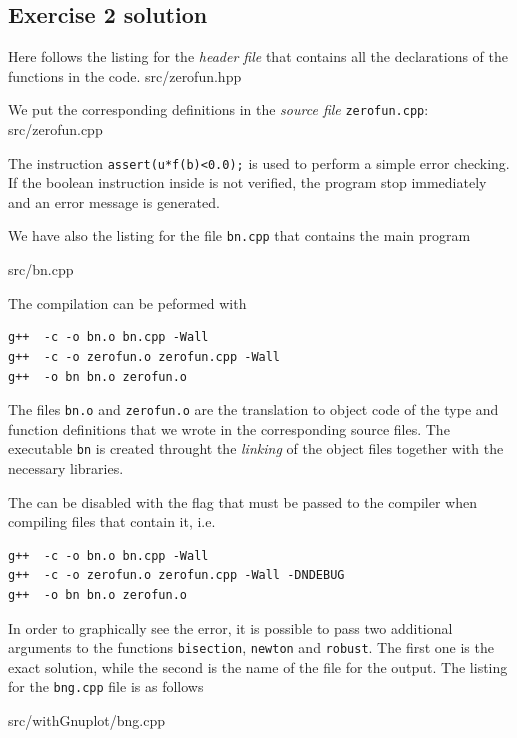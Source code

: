 \subsection*{Exercise 2 solution}

Here follows the listing for the \emph{header file} that contains all the
declarations of the functions in the code.
\lstset{basicstyle=\scriptsize\sf}
     {src/zerofun.hpp}
\lstset{basicstyle=\sf}

We put the corresponding definitions in the \emph{source file}
\texttt{zerofun.cpp}:
\lstset{basicstyle=\scriptsize\sf}
     {src/zerofun.cpp}
\lstset{basicstyle=\sf}

The instruction \texttt{assert(u*f(b)<0.0);} is used to perform a simple error
checking. If the boolean instruction inside is not verified, the program stop
immediately and an error message is generated.

We have also the listing for the file \texttt{bn.cpp} that contains the main
program
\lstset{basicstyle=\scriptsize\sf}
    
    {src/bn.cpp}
\lstset{basicstyle=\sf}

The compilation can be peformed with
\begin{verbatim}
g++  -c -o bn.o bn.cpp -Wall
g++  -c -o zerofun.o zerofun.cpp -Wall
g++  -o bn bn.o zerofun.o
\end{verbatim}

The files \texttt{bn.o} and \texttt{zerofun.o} are the translation to object
code of the type and function definitions that we wrote in the corresponding
source files. The executable \texttt{bn} is created throught the \emph{linking}
of the object files together with the necessary libraries.

The  can be disabled with the  flag that must be
passed to the compiler when compiling files that contain it, i.e.
\begin{verbatim}
g++  -c -o bn.o bn.cpp -Wall
g++  -c -o zerofun.o zerofun.cpp -Wall -DNDEBUG
g++  -o bn bn.o zerofun.o
\end{verbatim}

In order to graphically see the error, it is possible to pass two additional
arguments to the functions  \texttt{bisection}, \texttt{newton} and
\texttt{robust}. The first one is the exact solution, while the second is the
name of the file for the output.
The listing for the \texttt{bng.cpp} file is as follows
\lstset{basicstyle=\scriptsize\sf}
    
        {src/withGnuplot/bng.cpp}
\lstset{basicstyle=\sf}

